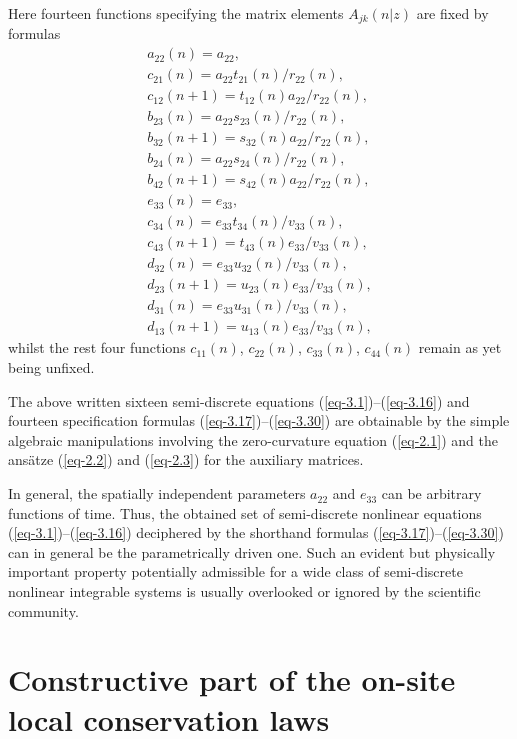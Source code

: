 \documentclass[10pt,a4paper]{amsart}
\numberwithin{equation}{section}
\begin{document}
Here fourteen functions specifying the matrix elements $A_{jk}(n|z)$ are fixed by formulas
\begin{gather}\label{eq-3.17}
	a_{22}(n)=a_{22},
\\ \label{eq-3.18}
	c_{21}(n)=a_{22}t_{21}(n)/r_{22}(n),
\\ \label{eq-3.19}
	c_{12}(n+1)=t_{12}(n)a_{22}/r_{22}(n),
\\ \label{eq-3.20}
	b_{23}(n)=a_{22}s_{23}(n)/r_{22}(n),
\\ \label{eq-3.21}
	b_{32}(n+1)=s_{32}(n)a_{22}/r_{22}(n),
\\ \label{eq-3.22}
	b_{24}(n)=a_{22}s_{24}(n)/r_{22}(n),
\\ \label{eq-3.23}
	b_{42}(n+1)=s_{42}(n)a_{22}/r_{22}(n),
\\ \label{eq-3.24}
	e_{33}(n)=e_{33},
\\ \label{eq-3.25}
	c_{34}(n)=e_{33}t_{34}(n)/v_{33}(n),
\\ \label{eq-3.26}
	c_{43}(n+1)=t_{43}(n)e_{33}/v_{33}(n),
\\ \label{eq-3.27}
	d_{32}(n)=e_{33}u_{32}(n)/v_{33}(n),
\\ \label{eq-3.28}
	d_{23}(n+1)=u_{23}(n)e_{33}/v_{33}(n),
\\ \label{eq-3.29}
	d_{31}(n)=e_{33}u_{31}(n)/v_{33}(n),
\\ \label{eq-3.30}
	d_{13}(n+1)=u_{13}(n)e_{33}/v_{33}(n) ,
\end{gather}
whilst the rest four functions $c_{11}(n)$, $c_{22}(n)$, $c_{33}(n)$, $c_{44}(n)$ remain as yet being unfixed.

The above written sixteen semi-discrete equations (\ref{eq-3.1})--(\ref{eq-3.16}) and fourteen specification formulas (\ref{eq-3.17})--(\ref{eq-3.30}) are obtainable by the simple algebraic manipulations involving the zero-curvature equation (\ref{eq-2.1}) and the ans\"{a}tze (\ref{eq-2.2}) and (\ref{eq-2.3}) for the auxiliary matrices.

In general, the spatially independent parameters $a_{22}$ and $e_{33}$ can be arbitrary functions of time. Thus, the obtained set of semi-discrete nonlinear equations (\ref{eq-3.1})--(\ref{eq-3.16}) deciphered by the shorthand formulas (\ref{eq-3.17})--(\ref{eq-3.30}) can in general be the parametrically driven one. Such an evident but physically important property potentially admissible for a wide class of semi-discrete nonlinear integrable systems is usually overlooked or ignored by the scientific community.

\section{Constructive part of the on-site local conservation laws}
\end{document}
